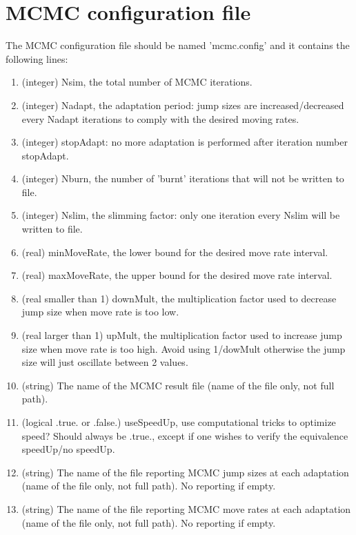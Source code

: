 \documentclass[a4paper]{article}
\begin{document}
	\section{MCMC configuration file}
	
	 The MCMC configuration file should be named 'mcmc.config' and it contains the following lines:
	
	\begin{enumerate}
		\item (integer) Nsim, the total number of MCMC iterations.
		\item (integer) Nadapt, the adaptation period: jump sizes are increased/decreased every Nadapt iterations to comply with the desired moving rates.
		\item (integer) stopAdapt: no more adaptation is performed after iteration number stopAdapt.
		\item (integer) Nburn, the number of 'burnt' iterations that will not be written to file.
		\item (integer) Nslim, the slimming factor: only one iteration every Nslim will be written to file.
		\item (real) minMoveRate, the lower bound for the desired move rate interval.
		\item (real) maxMoveRate, the upper bound for the desired move rate interval.
		\item (real smaller than 1)  downMult, the multiplication factor used to decrease jump size when move rate is too low.
		\item (real larger than 1)  upMult, the multiplication factor used to increase jump size when move rate is too high. Avoid using 1/dowMult otherwise the jump size will just oscillate between 2 values.
		\item (string) The name of the MCMC result file (name of the file only, not full path).
		\item (logical .true. or .false.) useSpeedUp, use computational tricks to optimize speed? Should always be .true., except if one wishes to verify the equivalence speedUp/no speedUp.
		\item (string) The name of the file reporting MCMC jump sizes at each adaptation (name of the file only, not full path). No reporting if empty.
		\item (string) The name of the file reporting MCMC move rates at each adaptation (name of the file only, not full path). No reporting if empty.
	\end{enumerate}
	
\end{document}
